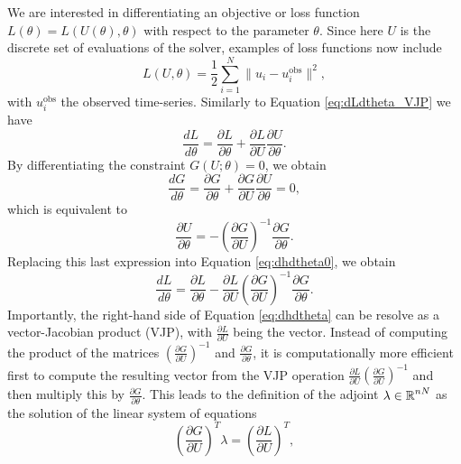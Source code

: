 We are interested in differentiating an objective or loss function $L(\theta) = L(U(\theta), \theta)$ with respect to the parameter $\theta$. 
Since here $U$ is the discrete set of evaluations of the solver, examples of loss functions now include 
\begin{equation}
    L(U, \theta) 
    = 
    \frac{1}{2} \sum_{i=1}^N \| u_i - u_i^\text{obs} \|^2, 
\end{equation}
with $u_i^\text{obs}$ the observed time-series. 
Similarly to Equation \eqref{eq:dLdtheta_VJP} we have 
\begin{equation}
    \frac{dL}{d\theta} 
    = 
    \frac{\partial L}{\partial \theta} 
    + 
    \frac{\partial L}{\partial U} \frac{\partial U}{\partial \theta}.
    \label{eq:dhdtheta0}
\end{equation}
By differentiating the constraint $G(U; \theta) = 0$, we obtain
\begin{equation}
    \frac{dG}{d\theta} 
    = 
    \frac{\partial G}{\partial \theta} 
    + 
    \frac{\partial G}{\partial U} \frac{\partial U}{\partial \theta}
    =
    0,
\end{equation}
which is equivalent to 
\begin{equation}
    \frac{\partial U}{\partial \theta} 
    = 
    - \left( \frac{\partial G}{\partial U} \right)^{-1} \frac{\partial G}{\partial \theta}.
    \label{eq:adjoint-inversion-implicit-theorem}
\end{equation}
Replacing this last expression into Equation \eqref{eq:dhdtheta0}, we obtain
\begin{equation}
    \frac{dL}{d\theta} 
    =
    \frac{\partial L}{\partial \theta} 
    - 
    \frac{\partial L}{\partial U}
    \left( \frac{\partial G}{\partial U} \right)^{-1} 
    \frac{\partial G}{\partial \theta}.
    \label{eq:dhdtheta}
\end{equation}
Importantly, the right-hand side of Equation \eqref{eq:dhdtheta} can be resolve as a vector-Jacobian product (VJP), with $\frac{\partial L}{\partial U}$ being the vector.
Instead of computing the product of the matrices $\left( \frac{\partial G}{\partial U} \right)^{-1}$ and $\frac{\partial G}{\partial \theta}$, it is computationally more efficient first to compute the resulting vector from the VJP operation $\frac{\partial L}{\partial U} \left( \frac{\partial G}{\partial U} \right)^{-1}$ and then multiply this by $\frac{\partial G}{\partial \theta}$.
This leads to the definition of the adjoint $\lambda \in \operatorname{\mathbb{R}}^{nN}$ as the solution of the linear system of equations 
\begin{equation}
    \left( \frac{\partial G}{\partial U}\right)^T \lambda 
    =  
    \left( \frac{\partial L}{\partial U} \right)^T,
    \label{eq:adjoint-state-equation}
\end{equation}
